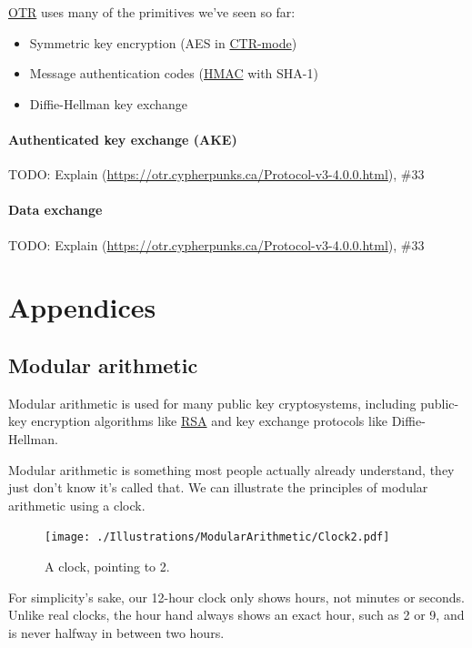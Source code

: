 \documentclass[11pt,ebook,table,dvipsnames]{memoir}
\begin{document}
\hyperref[OTR]{OTR} uses many of the primitives we've seen so far:

\begin{itemize}
\item Symmetric key encryption (\gls{AES} in \hyperref[CTR mode]{CTR-mode})
\item Message authentication codes (\hyperref[HMAC]{HMAC} with SHA-1)
\item Diffie-Hellman key exchange
\end{itemize}

\subsection{Authenticated key exchange (AKE)}
\label{sec-3-3-1-1}

TODO: Explain (\url{https://otr.cypherpunks.ca/Protocol-v3-4.0.0.html}), \#33
\subsection{Data exchange}
\label{sec-3-3-1-2}

TODO: Explain (\url{https://otr.cypherpunks.ca/Protocol-v3-4.0.0.html}), \#33
\part{Appendices}
\label{sec-4}
\appendix
\chapter{Modular arithmetic\label{Modular-arithmetic}}
\label{sec-4-1}

Modular arithmetic is used for many public key cryptosystems,
including \gls{public-key encryption} algorithms like \hyperref[RSA]{RSA} and
\gls{key exchange} protocols like Diffie-Hellman.

Modular arithmetic is something most people actually already
understand, they just don't know it's called that. We can illustrate
the principles of modular arithmetic using a clock.

\begin{figure}[ht!]
\centering
\texttt{[image: ./Illustrations/ModularArithmetic/Clock2.pdf]}
\caption{A clock, pointing to 2.}
\end{figure}

For simplicity's sake, our 12-hour clock only shows hours, not
minutes or seconds. Unlike real clocks, the hour hand always shows an
exact hour, such as 2 or 9, and is never halfway in between two
hours.
\end{document}
